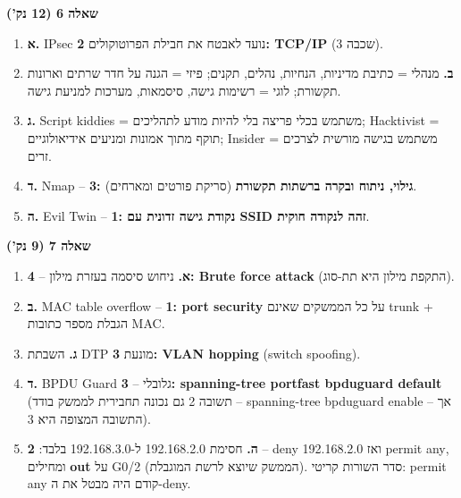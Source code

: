 \documentclass[11pt]{article}
\newcommand{\enLR}[1]{\textenglish{#1}}
\newcommand{\code}[1]{\textenglish{\codefont #1}}
\newcommand{\sectionheading}[1]{\vskip10pt\penalty-200{\large\bfseries\color{h2}#1\par}\vskip3pt}
\newcommand{\subheading}[1]{\vskip6pt{\bfseries\color{h3}#1\par}\vskip2pt}
\begin{document}
\subheading{שאלה \enLR{6 (12} נק')}

\begin{enumerate}
\item \textbf{א.} \enLR{IPsec} נועד לאבטח את חבילת הפרוטוקולים \textbf{\enLR{2: TCP/IP}} (שכבה \enLR{3).}
\item \textbf{ב.} מנהלי = כתיבת מדיניות, הנחיות, נהלים, תקנים; פיזי = הגנה על חדר שרתים וארונות תקשורת; לוגי = רשימות גישה, סיסמאות, מערכות למניעת גישה.
\item \textbf{ג.} \enLR{Script kiddies} = משתמש בכלי פריצה בלי להיות מודע לתהליכים; \enLR{Hacktivist} = תוקף מתוך אמונות ומניעים אידיאולוגיים; \enLR{Insider} = משתמש בגישה מורשית לצרכים זרים.
\item \textbf{ד.} \enLR{Nmap} – \textbf{\enLR{3}: גילוי, ניתוח ובקרה ברשתות תקשורת} (סריקת פורטים ומארחים).
\item \textbf{ה.} \enLR{Evil Twin} – \textbf{\enLR{1}: נקודת גישה זדונית עם \enLR{SSID} זהה לנקודה חוקית}.
\end{enumerate}

\subheading{שאלה \enLR{7 (9} נק')}

\begin{enumerate}
\item \textbf{א.} ניחוש סיסמה בעזרת מילון – \textbf{\enLR{4: Brute force attack}} (התקפת מילון היא תת-סוג).
\item \textbf{ב.} \enLR{MAC table overflow} – \textbf{\enLR{1: port security}} על כל הממשקים שאינם \enLR{trunk} + הגבלת מספר כתובות \enLR{MAC.}
\item \textbf{ג.} השבתת \enLR{DTP} מונעת \textbf{\enLR{3: VLAN hopping}} \enLR{(switch spoofing).}
\item \textbf{ד.} \enLR{BPDU Guard} גלובלי – \textbf{\enLR{3}: \code{spanning-tree portfast bpduguard default}} (תשובה \enLR{2} גם נכונה תחבירית לממשק בודד – \code{spanning-tree bpduguard enable} – אך התשובה המצופה היא \enLR{3).}
\item \textbf{ה.} חסימת \enLR{192.168.2.0} ל-\enLR{192.168.3.0} בלבד: \textbf{\enLR{2}} – \code{deny 192.168.2.0} ואז \code{permit any}, ומחילים \textbf{\enLR{out}} על \enLR{G0/2} (הממשק שיוצא לרשת המוגבלת). סדר השורות קריטי: \enLR{permit any} קודם היה מבטל את ה-\enLR{deny.}
\end{enumerate}

\sectionheading{סביבת מעבדה מומלצת}
\end{document}

